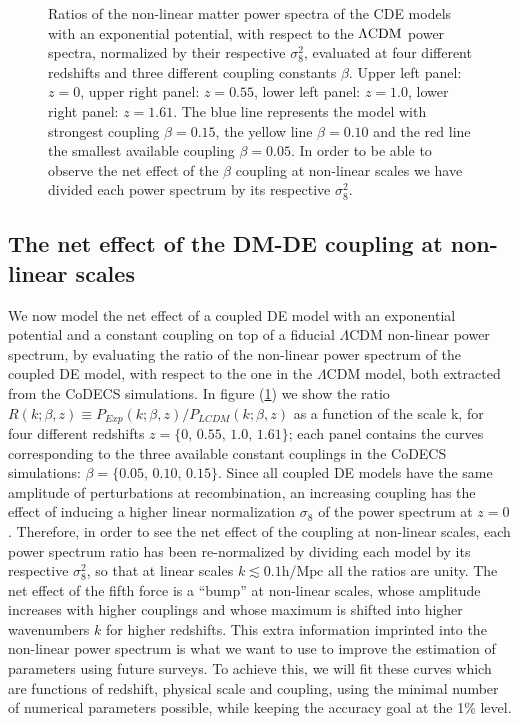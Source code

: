 \begin{figure}
{Ratios of the non-linear matter power spectra of the 
CDE models with an exponential potential, with respect to the 
$\protect\Lambda\mathrm{CDM}$ power spectra, normalized by their respective $\sigma_{8}^{2}$,
evaluated at four different redshifts and three different coupling
constants $\beta$. Upper left panel: $z=0$, upper right panel: $z=0.55$,
lower left panel: $z=1.0$, lower right panel: $z=1.61$. The blue
line represents the model with strongest coupling \textbf{$\beta=0.15$},
the yellow line $\beta=0.10$ and the red line the smallest available
coupling $\beta=0.05$. In order to be able to observe the net effect
of the $\beta$ coupling at non-linear scales we have divided each
power spectrum by its respective $\sigma_{8}^{2}$.}
\label{fig:Ratio-of-CoDECS} 
\end{figure}

\subsection{The net effect of the DM-DE coupling at non-linear scales}

We now model the net effect of a coupled DE model with an exponential
potential and a constant coupling on top of a fiducial $\Lambda$CDM
non-linear power spectrum, by evaluating the ratio of the non-linear
power spectrum of the coupled DE model, with respect to the one in
the $\Lambda$CDM model, both extracted from the CoDECS simulations.
In figure (\ref{fig:Ratio-of-CoDECS}) we show the ratio $R(k;\beta,z)\equiv P_{Exp}(k;\beta,z)/P_{LCDM}(k;\beta,z)$
as a function of the scale k, for four different redshifts $z=\{0,\,0.55,\,1.0,\,1.61\}$;
each panel contains the curves corresponding to the three available
constant couplings in the CoDECS simulations: \textbf{$\beta=\{0.05,\,0.10,\,0.15\}$}.
Since all coupled DE models have the same amplitude of perturbations
at recombination, an increasing coupling has the effect of inducing
a higher linear normalization $\sigma_{8}$ of the power spectrum
at $z=0$ \citep{baldi_codecs_2012}. Therefore, in order to see the
net effect of the coupling at non-linear scales, each power spectrum
ratio has been re-normalized by dividing each model by its respective
$\sigma_{8}^{2}$, so that at linear scales $k\lesssim0.1\mbox{h}/\mbox{Mpc}$
all the ratios are unity. The net effect of the fifth force is a ``bump''
at non-linear scales, whose amplitude increases with higher couplings
and whose maximum is shifted into higher wavenumbers $k$ for higher
redshifts. This extra information imprinted into the non-linear power
spectrum is what we want to use to improve the estimation of parameters
using future surveys. To achieve this, we will fit these curves which
are functions of redshift, physical scale and coupling, using the
minimal number of numerical parameters possible, while keeping the
accuracy goal at the 1\% level.


